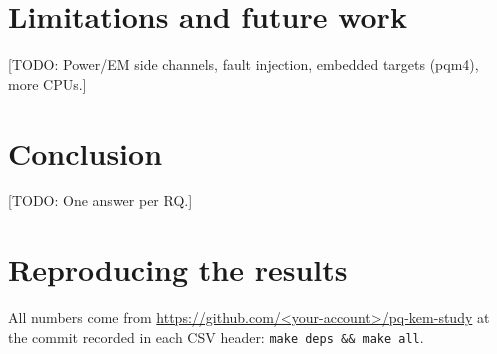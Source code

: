 \documentclass[11pt,a4paper]{article}
\newcommand{\todo}[1]{\textcolor{red!70!black}{[TODO: #1]}}
\begin{document}
\section{Limitations and future work}\label{sec:limits}
\todo{Power/EM side channels, fault injection, embedded targets (pqm4), more CPUs.}

\section{Conclusion}\label{sec:conclusion}
\todo{One answer per RQ.}

\appendix
\section{Reproducing the results}
All numbers come from \url{https://github.com/<your-account>/pq-kem-study} at the commit recorded in each CSV
header: \texttt{make deps \&\& make all}.
\end{document}
